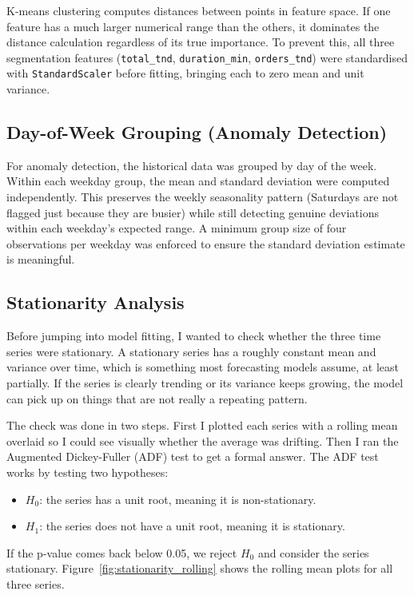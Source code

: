 \documentclass[12pt, a4paper]{report}
\begin{document}
K-means clustering computes distances between points in feature space. If one
feature has a much larger numerical range than the others, it dominates the
distance calculation regardless of its true importance. To prevent this, all
three segmentation features (\texttt{total\_tnd}, \texttt{duration\_min},
\texttt{orders\_tnd}) were standardised with \texttt{StandardScaler} before
fitting, bringing each to zero mean and unit variance.

\subsection{Day-of-Week Grouping (Anomaly Detection)}

For anomaly detection, the historical data was grouped by day of the week. Within
each weekday group, the mean and standard deviation were computed independently.
This preserves the weekly seasonality pattern (Saturdays are not flagged just
because they are busier) while still detecting genuine deviations within each
weekday's expected range. A minimum group size of four observations per weekday
was enforced to ensure the standard deviation estimate is meaningful.

\subsection{Stationarity Analysis}

Before jumping into model fitting, I wanted to check whether the three time series
were stationary. A stationary series has a roughly constant mean and variance over
time, which is something most forecasting models assume, at least partially.
If the series is clearly trending or its variance keeps growing, the model can pick
up on things that are not really a repeating pattern.

The check was done in two steps. First I plotted each series with a rolling mean
overlaid so I could see visually whether the average was drifting. Then I ran the
Augmented Dickey-Fuller (ADF) test to get a formal answer. The ADF test works by
testing two hypotheses:

\begin{itemize}
  \item $H_0$: the series has a unit root, meaning it is non-stationary.
  \item $H_1$: the series does not have a unit root, meaning it is stationary.
\end{itemize}

If the p-value comes back below 0.05, we reject $H_0$ and consider the series
stationary. Figure~\ref{fig:stationarity_rolling} shows the rolling mean plots
for all three series.
\end{document}
